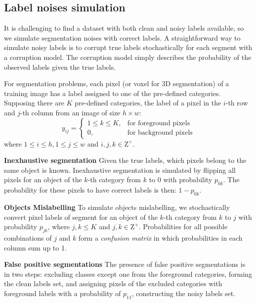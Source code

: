 \subsection{Label noises simulation}
\label{subsec:noises}

It is challenging to find a dataset with both clean and noisy labels available, so we simulate segmentation noises with correct labels.
A straightforward way to simulate noisy labels is to corrupt true labels stochastically for each segment with a corruption model.
The corruption model simply describes the probability of the observed labels given the true labels.

For segmentation problems, each pixel (or voxel for 3D segmentation) of a training image has a label assigned to one of the pre-defined categories.
Supposing there are $K$ pre-defined categories, the label of a pixel in the $i$-th row and $j$-th column from an image of size $h \times w$:
\[
  y_{ij} =
    \begin{cases}
      1 \leq k \leq K, & \text{for foreground pixels} \\
      0, & \text{for background pixels}
    \end{cases}
\]
where $1 \leq i \leq h, 1 \leq j \leq w$ and $i,j,k \in \mathrm{Z}^+$.


\textbf{Inexhaustive segmentation}
Given the true labels, which pixels belong to the same object is known.
Inexhaustive segmentation is simulated by flipping all pixels for an object of the $k$-th category from $k$ to $0$ with probability $p_{0k}$.
The probability for these pixels to have correct labels is then: $1-p_{0k}$.


\textbf{Objects Mislabelling}
To simulate objects mislabelling, we stochastically convert pixel labels of segment for an object of the $k$-th category from $k$ to $j$ with probability $p_{jk}$, where $j, k \leq K$ and $j,k \in \mathrm{Z}^+$.
Probabilities for all possible combinations of $j$ and $k$ form a \textit{confusion matrix} in which probabilities in each column sum up to 1.

\textbf{False positive segmentations}
The presence of false positive segmentations is in two steps: excluding classes except one from the foreground categories, forming the clean labels set, and assigning pixels of the excluded categories with foreground labels with a probability of $p_{11}$, constructing the noisy labels set.%
